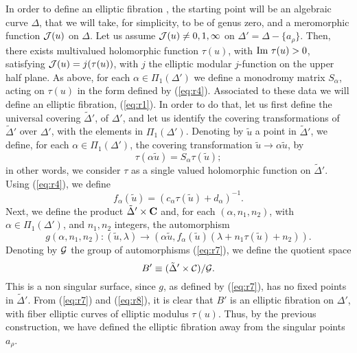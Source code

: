 In order to define an elliptic fibration \cite{Kodaira}, the starting point will
be an algebraic curve $\Delta$, that we will take, for
simplicity, to be of genus zero, and a meromorphic function
${\cal J}(u)$ on $\Delta$. Let us assume ${\cal J}(u) \neq
0,1,\infty$ on $\Delta' =\Delta-\{a_{\rho}\}$. Then, there
exists multivalued holomorphic function $\tau(u)$, with $\hbox
{Im } \tau(u)>0$, satisfying ${\cal J}(u) = j(\tau(u))$, with $j$
the elliptic modular $j$-function on the upper half plane. As
above, for each $\alpha \in \Pi_1(\Delta')$ we define a monodromy
matrix $S_{\alpha}$, acting on $\tau(u)$ in the form defined by
(\ref{eq:r4}). Associated to these data we will define an elliptic 
fibration, (\ref{eq:r1}). In order to do that, let us first define 
the universal covering $\tilde{\Delta}'$, of $\Delta'$, and let
us identify the covering transformations of $\tilde{\Delta}'$
over $\Delta'$, with the elements in $\Pi_1(\Delta')$. Denoting
by $\tilde{u}$ a point in $\tilde{\Delta}'$, we define, for each
$\alpha \in \Pi_1(\Delta')$, the covering transformation
$\tilde{u} \rightarrow \alpha \tilde{u}$, by
\begin{equation}
\tau(\alpha \tilde{u}) = S_{\alpha} \tau(\tilde{u});
\label{eq:r5}
\end{equation}
in other words, we consider $\tau$ as a single valued holomorphic
function on $\tilde{\Delta}'$. Using (\ref{eq:r4}), we define
\begin{equation}
f_{\alpha}(\tilde{u}) = (c_{\alpha} \tau(\tilde{u}) +
d_{\alpha})^{-1}.
\label{eq:r6}
\end{equation}
Next, we define the product $\tilde{\Delta}' \times {\bf C}$ and,
for each $(\alpha,n_1,n_2)$, with $\alpha \in \Pi_1(\Delta')$,
and $n_1,n_2$ integers, the automorphism
\begin{equation}
g(\alpha,n_1,n_2) : (\tilde{u},\lambda) \rightarrow (\alpha
\tilde{u}, f_{\alpha} (\tilde{u}) (\lambda+n_1 \tau
(\tilde{u})+n_2)).
\label{eq:r7}
\end{equation}
Denoting by ${\cal G}$ the group of automorphisms (\ref{eq:r7}),
we define the quotient space
\begin{equation}
B' \equiv (\tilde{\Delta}' \times {\cal C}) / {\cal G}.
\label{eq:r8}
\end{equation}
This is a non singular surface, since $g$, as defined by
(\ref{eq:r7}), has no fixed points in $\tilde{\Delta}'$. From
(\ref{eq:r7}) and (\ref{eq:r8}), it is clear that $B'$ is an
elliptic fibration on $\Delta'$, with fiber elliptic curves of
elliptic modulus $\tau(u)$. Thus, by the previous construction, we
have defined the elliptic fibration away from the singular points
$a_{\rho}$. 
  
